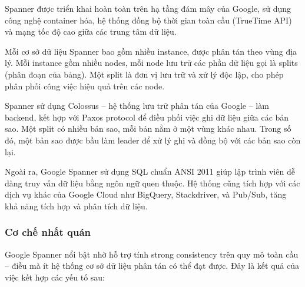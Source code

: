 \documentclass[conference]{IEEEtran}
\begin{document}
Spanner được triển khai hoàn toàn trên hạ tầng đám mây của Google, sử dụng công nghệ container hóa, hệ thống đồng bộ thời gian toàn cầu (TrueTime API) và mạng tốc độ cao giữa các trung tâm dữ liệu.

Mỗi cơ sở dữ liệu Spanner bao gồm nhiều instance, được phân tán theo vùng địa lý. Mỗi instance gồm nhiều nodes, mỗi node lưu trữ các phần dữ liệu gọi là splits (phân đoạn của bảng). Một split là đơn vị lưu trữ và xử lý độc lập, cho phép phân phối công việc hiệu quả trên các node.

Spanner sử dụng Colossus – hệ thống lưu trữ phân tán của Google – làm backend, kết hợp với Paxos protocol để điều phối việc ghi dữ liệu giữa các bản sao. Một split có nhiều bản sao, mỗi bản nằm ở một vùng khác nhau. Trong số đó, một bản sao được bầu làm leader để xử lý ghi và đồng bộ với các bản sao còn lại.

Ngoài ra, Google Spanner sử dụng SQL chuẩn ANSI 2011 giúp lập trình viên dễ dàng truy vấn dữ liệu bằng ngôn ngữ quen thuộc. Hệ thống cũng tích hợp với các dịch vụ khác của Google Cloud như BigQuery, Stackdriver, và Pub/Sub, tăng khả năng tích hợp và phân tích dữ liệu.
\subsubsection{Cơ chế nhất quán}
Google Spanner nổi bật nhờ hỗ trợ tính strong consistency trên quy mô toàn cầu – điều mà ít hệ thống cơ sở dữ liệu phân tán có thể đạt được. Đây là kết quả của việc kết hợp các yếu tố sau:
\end{document}
